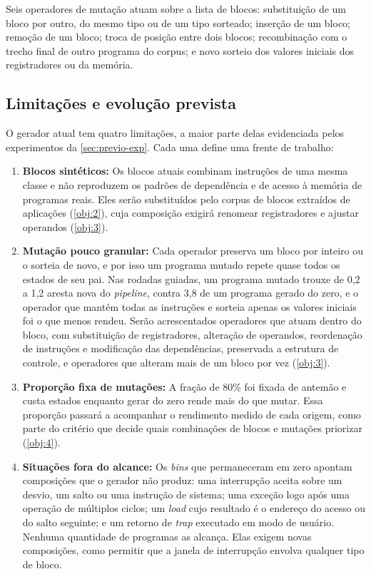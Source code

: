 Seis operadores de mutação atuam sobre a lista de blocos: substituição de um bloco por outro, do mesmo tipo ou de um tipo sorteado; inserção de um bloco; remoção de um bloco; troca de posição entre dois blocos; recombinação com o trecho final de outro programa do corpus; e novo sorteio dos valores iniciais dos registradores ou da memória.

\subsection{Limitações e evolução prevista}\label{sec:previo-gerador-planos}

O gerador atual tem quatro limitações, a maior parte delas evidenciada pelos experimentos da \cref{sec:previo-exp}. Cada uma define uma frente de trabalho:

\begin{enumerate}
    \item \textbf{Blocos sintéticos:} Os blocos atuais combinam instruções de uma mesma classe e não reproduzem os padrões de dependência e de acesso à memória de programas reais. Eles serão substituídos pelo corpus de blocos extraídos de aplicações (\cref{obj:2}), cuja composição exigirá renomear registradores e ajustar operandos (\cref{obj:3}).

    \item \textbf{Mutação pouco granular:} Cada operador preserva um bloco por inteiro ou o sorteia de novo, e por isso um programa mutado repete quase todos os estados de seu pai. Nas rodadas guiadas, um programa mutado trouxe de 0,2 a 1,2 aresta nova do \textit{pipeline}, contra 3,8 de um programa gerado do zero, e o operador que mantém todas as instruções e sorteia apenas os valores iniciais foi o que menos rendeu. Serão acrescentados operadores que atuam dentro do bloco, com substituição de registradores, alteração de operandos, reordenação de instruções e modificação das dependências, preservada a estrutura de controle, e operadores que alteram mais de um bloco por vez (\cref{obj:3}).

    \item \textbf{Proporção fixa de mutações:} A fração de 80\% foi fixada de antemão e custa estados enquanto gerar do zero rende mais do que mutar. Essa proporção passará a acompanhar o rendimento medido de cada origem, como parte do critério que decide quais combinações de blocos e mutações priorizar (\cref{obj:4}).

    \item \textbf{Situações fora do alcance:} Os \textit{bins} que permaneceram em zero apontam composições que o gerador não produz: uma interrupção aceita sobre um desvio, um salto ou uma instrução de sistema; uma exceção logo após uma operação de múltiplos ciclos; um \textit{load} cujo resultado é o endereço do acesso ou do salto seguinte; e um retorno de \textit{trap} executado em modo de usuário. Nenhuma quantidade de programas as alcança. Elas exigem novas composições, como permitir que a janela de interrupção envolva qualquer tipo de bloco.
\end{enumerate}

